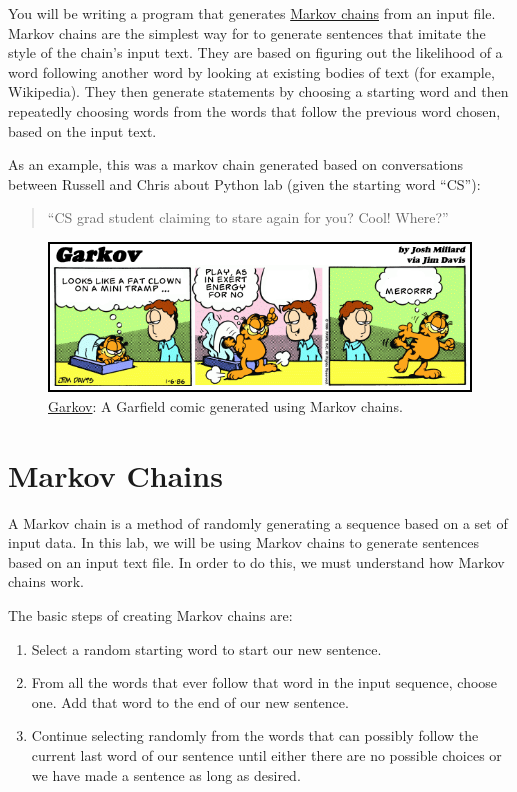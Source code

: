 \documentclass[11pt]{cselabheader}
\begin{document}
You will be writing a program that generates
\href{http://en.wikipedia.org/wiki/Markov_chain}{Markov chains} from an input
file. Markov chains are the simplest way for to generate sentences that
imitate the style of the chain's input text. They are based on figuring out the
likelihood of a word following another word by looking at existing bodies of
text (for example, Wikipedia). They then generate statements by choosing a
starting word and then repeatedly choosing words from the words that follow
the previous word chosen, based on the input text.

As an example, this was a markov chain generated based on conversations between
Russell and Chris about Python lab (given the starting word ``CS''):
\begin{quotation}
``CS grad student claiming to stare again for you? Cool! Where?''
\end{quotation}


\begin{figure}[!ht]
  \centering
  \includegraphics[width=\linewidth]{img/garkov}
  \caption*{\href{http://joshmillard.com/garkov/}{Garkov}:
    A Garfield comic generated using Markov chains.}
  \label{garkov}
\end{figure}

\tableofcontents

\pagebreak

\section{Markov Chains}
\label{sec:markov}

A Markov chain is a method of randomly generating a sequence based on a set of
input data. In this lab, we will be using Markov chains to generate sentences
based on an input text file. In order to do this, we must understand how Markov
chains work.

The basic steps of creating Markov chains are:
\begin{enumerate}
  \item Select a random starting word to start our new sentence.
  \item From all the words that ever follow that word in the input sequence,
    choose one. Add that word to the end of our new sentence.
  \item Continue selecting randomly from the words that can possibly follow the
    current last word of our sentence until either there are no possible
    choices or we have made a sentence as long as desired.
\end{enumerate}
\end{document}
